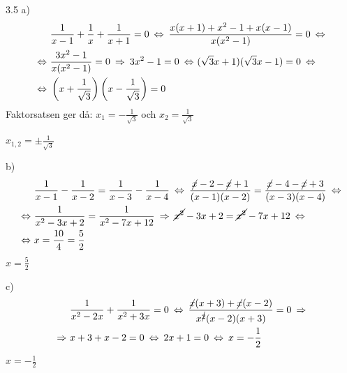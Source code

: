 \begin{task}{3.5 a)}
	\begin{align*}
	&\dfrac{1}{x-1}+\dfrac{1}{x}+\dfrac{1}{x+1}=0\lra
	\dfrac{x(x+1)+x^2-1+x(x-1)}{x(x^2-1)}=0 \lra \\ \lra
	&\dfrac{3x^2-1}{x(x^2-1)}=0\ra
	3x^2-1=0 \lra
	(\sqrt{3}x+1)(\sqrt{3}x-1)=0 \lra \\ \lra
	&\left(x+\frac{1}{\sqrt{3}}\right)\left(x-\frac{1}{\sqrt{3}}\right)=0
	\end{align*}
	Faktorsatsen ger då: $x_1=-\frac{1}{\sqrt{3}}$ och $x_2=\frac{1}{\sqrt{3}}$
	
	\ans $x_{1,2}=\pm\frac{1}{\sqrt{3}}$
\end{task}

\begin{task}{b)}
	\begin{align*}
	&\dfrac{1}{x-1}-\dfrac{1}{x-2}=\dfrac{1}{x-3}-\dfrac{1}{x-4}\lra
	\dfrac{\cancel{x}-2-\cancel{x}+1}{(x-1)(x-2)}=\dfrac{\cancel{x}-4-\cancel{x}+3}{(x-3)(x-4)} \lra \\ \lra
	&\dfrac{1}{x^2-3x+2}=\dfrac{1}{x^2-7x+12} \ra
	\cancel{x^2}-3x+2=\cancel{x^2}-7x+12 \lra \\ \lra
	&x=\frac{10}{4}=\frac{5}{2}
	\end{align*}
	\ans $x=\frac{5}{2}$
\end{task}

\begin{task}{c)}
	\begin{align*}
	&\dfrac{1}{x^2-2x}+\dfrac{1}{x^2+3x}=0 \lra
	\dfrac{\cancel{x}(x+3)+\cancel{x}(x-2)}{x^{\cancel{2}}(x-2)(x+3)}=0 \ra \\ \ra
	&x+3+x-2=0 \lra
	2x+1=0 \lra
	x=-\frac{1}{2}
	\end{align*}
	\ans $x=-\frac{1}{2}$
\end{task}

